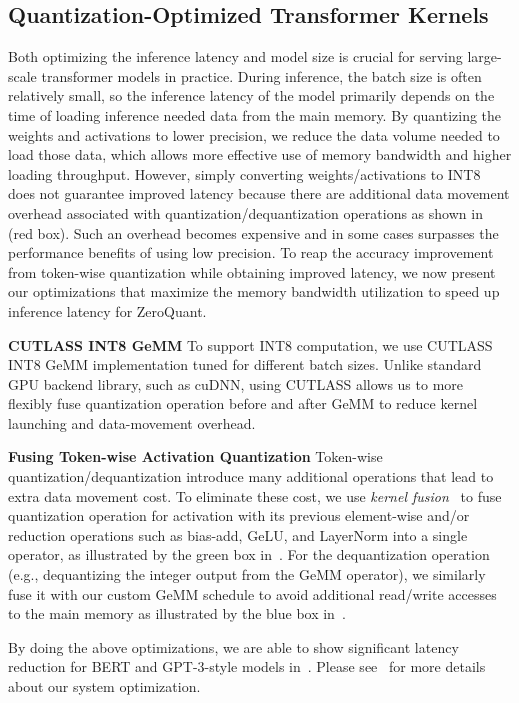 \subsection{Quantization-Optimized Transformer Kernels}
\label{sec:system_optimization}

Both optimizing the inference latency and model size is crucial for serving large-scale transformer models in practice. During inference, the batch size is often relatively small, so the inference latency of the model primarily depends on the time of loading inference needed data from the main memory. By quantizing the weights and activations to lower precision, we reduce the data volume needed to load those data, which allows more effective use of memory bandwidth and higher loading throughput. However, simply converting weights/activations to INT8 does not guarantee improved latency because there are additional data movement overhead associated with quantization/dequantization operations as shown in~ (red box). Such an overhead becomes expensive and in some cases surpasses the performance benefits of using low precision. To reap the accuracy improvement from token-wise quantization while obtaining improved latency, we now present our optimizations that maximize the memory bandwidth utilization to speed up inference latency for ZeroQuant.  

\textbf{CUTLASS INT8 GeMM} To support INT8 computation, we use CUTLASS~\cite{cutlass} INT8 GeMM implementation tuned for different batch sizes. Unlike standard GPU backend library, such as cuDNN, using CUTLASS allows us to more flexibly fuse quantization operation before and after GeMM to reduce kernel launching and data-movement overhead.

\textbf{Fusing Token-wise Activation Quantization} Token-wise quantization/dequantization introduce many additional operations that lead to extra data movement cost. To eliminate these cost, we use \emph{kernel fusion}~\cite{kernel-fusion} to fuse quantization operation for activation with its previous element-wise and/or reduction operations such as bias-add, GeLU, and LayerNorm into a single operator, as illustrated by the green box in~. 
For the dequantization operation (e.g., dequantizing the integer output from the GeMM operator), we similarly fuse it with our custom GeMM schedule to avoid additional read/write accesses to the main memory as illustrated by the blue box in~. 

By doing the above optimizations, we are able to show significant latency reduction for BERT and GPT-3-style models in~.
Please see~ for more details about our system optimization. 

